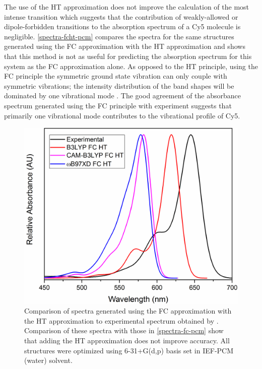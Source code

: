 The use of the HT approximation does not improve the calculation of the most intense transition which suggests that the contribution of weakly-allowed or dipole-forbidden transitions to the absorption spectrum of a Cy5 molecule is negligible. \autoref{spectra-fcht-pcm} compares the spectra for the same structures generated using the FC approximation with the HT approximation and shows that this method is not as useful for predicting the absorption spectrum for this system as the FC approximation alone. As opposed to the HT principle, using the FC principle the symmetric ground state vibration can only couple with symmetric vibrations; the intensity distribution of the band shapes will be dominated by one vibrational mode \cite{Mustroph2018}. The good agreement of the absorbance spectrum generated using the FC principle with experiment suggests that primarily one vibrational mode contributes to the vibrational profile of Cy5. 
\begin{figure}[h!]
    \centering
    \includegraphics[width=0.8\linewidth]{figures/pub1/FCHT-PCM.pdf}
    \caption[Comparison of spectra generated using the FC approximation with the HT approximation to experimental spectrum obtained by Cannon. Comparison of these spectra with those in \autoref{spectra-fc-pcm} show that adding the HT approximation does not improve accuracy. All structures were optimized using 6-31+G(d,p) basis set in IEF-PCM (water) solvent.]{Comparison of spectra generated using the FC approximation with the HT approximation to experimental spectrum obtained by \cite{Cannon2017}. Comparison of these spectra with those in \autoref{spectra-fc-pcm} show that adding the HT approximation does not improve accuracy. All structures were optimized using 6-31+G(d,p) basis set in IEF-PCM (water) solvent.}\label{spectra-fcht-pcm}
\end{figure}

